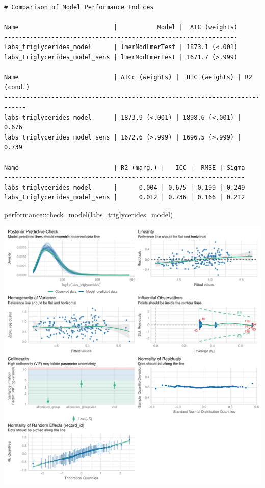 \documentclass[
  letterpaper,
  DIV=11,
  numbers=noendperiod]{scrartcl}
\newenvironment{Shaded}{\begin{snugshade}}{\end{snugshade}}
\newcommand{\FunctionTok}[1]{\textcolor[rgb]{0.28,0.35,0.67}{#1}}
\newcommand{\NormalTok}[1]{\textcolor[rgb]{0.00,0.23,0.31}{#1}}
\newcommand{\SpecialCharTok}[1]{\textcolor[rgb]{0.37,0.37,0.37}{#1}}
\begin{document}
\begin{verbatim}
# Comparison of Model Performance Indices

Name                          |           Model |  AIC (weights)
----------------------------------------------------------------
labs_triglycerides_model      | lmerModLmerTest | 1873.1 (<.001)
labs_triglycerides_model_sens | lmerModLmerTest | 1671.7 (>.999)

Name                          | AICc (weights) |  BIC (weights) | R2 (cond.)
----------------------------------------------------------------------------
labs_triglycerides_model      | 1873.9 (<.001) | 1898.6 (<.001) |      0.676
labs_triglycerides_model_sens | 1672.6 (>.999) | 1696.5 (>.999) |      0.739

Name                          | R2 (marg.) |   ICC |  RMSE | Sigma
------------------------------------------------------------------
labs_triglycerides_model      |      0.004 | 0.675 | 0.199 | 0.249
labs_triglycerides_model_sens |      0.012 | 0.736 | 0.166 | 0.212
\end{verbatim}

\begin{Shaded}
\begin{Highlighting}[]
\NormalTok{performance}\SpecialCharTok{::}\FunctionTok{check\_model}\NormalTok{(labs\_triglycerides\_model)}
\end{Highlighting}
\end{Shaded}

\includegraphics{Outcomes_V1V2V3_files/figure-pdf/labs_triglycerides_4-1.pdf}
\end{document}
